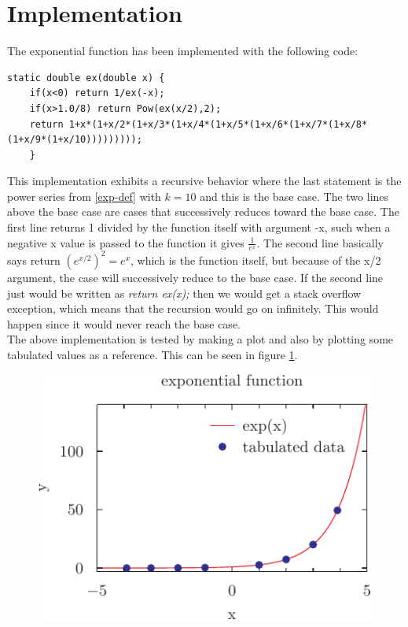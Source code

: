 \documentclass[twocolumn, a4paper]{article}
\begin{document}
\section*{Implementation}
The exponential function has been implemented with the following code:
\begin{lstlisting}
static double ex(double x) {
	if(x<0) return 1/ex(-x);
	if(x>1.0/8) return Pow(ex(x/2),2);
	return 1+x*(1+x/2*(1+x/3*(1+x/4*(1+x/5*(1+x/6*(1+x/7*(1+x/8*(1+x/9*(1+x/10)))))))));
	}
\end{lstlisting}
This implementation exhibits a recursive behavior where the last statement is the power series from \eqref{exp-def} with $k=10$ and this is the base case. The two lines above the base case are cases that successively reduces toward the base case. The first line returns 1 divided by the function itself with argument -x, such when a negative x value is passed to the function it gives $\frac{1}{\textit{e}^x}$. The second line basically says return $\left(\textit{e}^{x/2}\right)^2 = \textit{e}^x$, which is the function itself, but because of the x/2 argument, the case will successively reduce to the base case. If the second line just would be written as \textit{return ex(x);} then we would get a stack overflow exception, which means that the recursion would go on infinitely. This would happen since it would never reach the base case.\\
The above implementation is tested by making a plot and also by plotting some tabulated values as a reference. This can be seen in figure \ref{exp-graph}.
\begin{figure}[!h]
	\includegraphics{exp_pyx.pdf}
	\label{exp-graph}
\end{figure}
\end{document}
